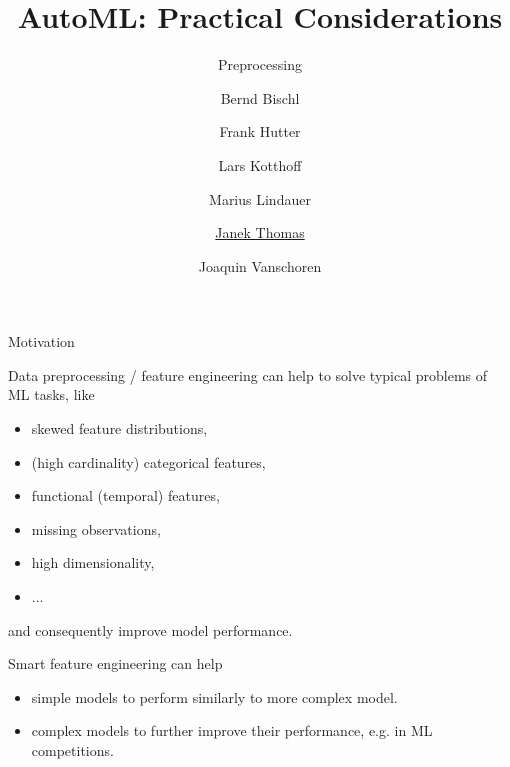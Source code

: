 

\usepackage[normalem]{ulem}
\usepackage{pifont}
\usepackage{relsize}
\renewcommand{\lit}[1]{{\smaller\color{black!60}[#1]}}
\title[AutoML: Practical]{AutoML: Practical Considerations} 
\subtitle{Preprocessing}
\author[Janek Thomas]{Bernd Bischl \and Frank Hutter \and Lars Kotthoff\newline \and Marius Lindauer \and \underline{Janek Thomas} \and Joaquin Vanschoren}



	
	\maketitle
	

	\begin{frame}{Motivation}

	Data preprocessing / feature engineering can help to solve typical problems of ML tasks, like
	
	\begin{itemize}
		\item skewed feature distributions,
		\item (high cardinality) categorical features,
		\item functional (temporal) features,
		\item missing observations,
		\item high dimensionality,
		\item ...
	\end{itemize}

	and consequently improve model performance.

	Smart feature engineering can help

	\begin{itemize}
		\item simple models to perform similarly to more complex model.
		\item complex models to further improve their performance, e.g. in ML competitions. 
	\end{itemize}

\end{frame}

